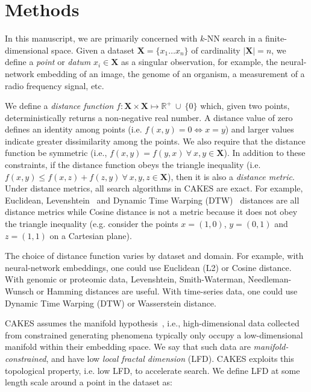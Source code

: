 \section{Methods}
\label{sec:methods}

In this manuscript, we are primarily concerned with $k$-NN search in a finite-dimensional space.
Given a dataset $\textbf{X} = \{x_1 \dots x_n\}$ of cardinality $|\textbf{X}| = n$, we define a \emph{point} or \emph{datum} $x_i \in \textbf{X}$ as a singular observation, for example, the neural-network embedding of an image, the genome of an organism, a measurement of a radio frequency signal, etc.

We define a \emph{distance function} $f : \textbf{X} \times \textbf{X} \mapsto \mathbb{R}^+ \ \cup \ \{0\}$ which, given two points, deterministically returns a non-negative real number.
A distance value of zero defines an identity among points (i.e. $f(x, y) = 0 \Leftrightarrow x = y$) and larger values indicate greater dissimilarity among the points.
We also require that the distance function be symmetric (i.e., $f(x, y) = f(y, x) \ \forall \ x, y \in \textbf{X}$).
In addition to these constraints, if the distance function obeys the triangle inequality (i.e. $f(x, y) \leq f(x, z) + f(z, y) \ \forall \ x, y, z \in \textbf{X}$), then it is also a \emph{distance metric}.
Under distance metrics, all search algorithms in CAKES are exact.
For example, Euclidean, Levenshtein~\cite{levenshtein1966binary} and Dynamic Time Warping (DTW)~\cite{muller2007dynamic} distances are all distance metrics while Cosine distance is not a metric because it does not obey the triangle inequality (e.g. consider the points $x = (1, 0)$, $y = (0, 1)$ and $z = (1, 1)$ on a Cartesian plane).

The choice of distance function varies by dataset and domain.
For example, with neural-network embeddings, one could use Euclidean (L2) or Cosine distance.
With genomic or proteomic data, Levenshtein, Smith-Waterman, Needleman-Wunsch or Hamming distances are useful.
With time-series data, one could use Dynamic Time Warping (DTW) or Wasserstein distance.

CAKES assumes the manifold hypothesis~\cite{fefferman2016testing}, i.e., high-dimensional data collected from constrained generating phenomena typically only occupy a low-dimensional manifold within their embedding space.
We say that such data are \emph{manifold-constrained}, and have low \emph{local fractal dimension} (LFD).
CAKES exploits this topological property, i.e. low LFD, to accelerate search.
We define LFD at some length scale around a point in the dataset as:

